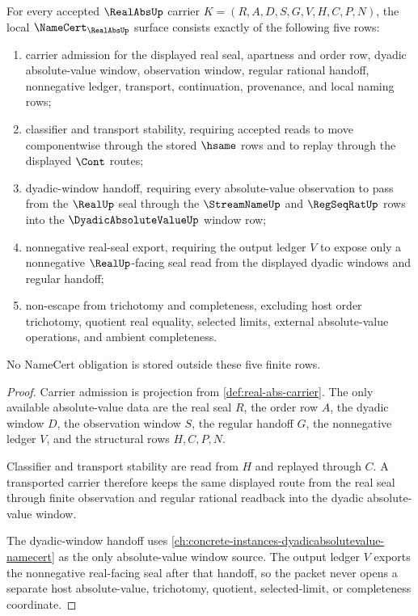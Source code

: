 \begin{theorem}
\label{thm:real-abs-namecert-obligations}
For every accepted $\RealAbsUp$ carrier $K=(R,A,D,S,G,V,H,C,P,N)$, the local $\NameCert_{\RealAbsUp}$ surface consists exactly of the following five rows:
\begin{enumerate}
\item carrier admission for the displayed real seal, apartness and order row, dyadic absolute-value window, observation window, regular rational handoff, nonnegative ledger, transport, continuation, provenance, and local naming rows;
\item classifier and transport stability, requiring accepted reads to move componentwise through the stored $\hsame$ rows and to replay through the displayed $\Cont$ routes;
\item dyadic-window handoff, requiring every absolute-value observation to pass from the $\RealUp$ seal through the $\StreamNameUp$ and $\RegSeqRatUp$ rows into the $\DyadicAbsoluteValueUp$ window row;
\item nonnegative real-seal export, requiring the output ledger $V$ to expose only a nonnegative $\RealUp$-facing seal read from the displayed dyadic windows and regular handoff;
\item non-escape from trichotomy and completeness, excluding host order trichotomy, quotient real equality, selected limits, external absolute-value operations, and ambient completeness.
\end{enumerate}
No NameCert obligation is stored outside these five finite rows.
\end{theorem}
\begin{proof}
Carrier admission is projection from \autoref{def:real-abs-carrier}. The only available absolute-value data are the real seal $R$, the order row $A$, the dyadic window $D$, the observation window $S$, the regular handoff $G$, the nonnegative ledger $V$, and the structural rows $H,C,P,N$.

Classifier and transport stability are read from $H$ and replayed through $C$. A transported carrier therefore keeps the same displayed route from the real seal through finite observation and regular rational readback into the dyadic absolute-value window.

The dyadic-window handoff uses \autoref{ch:concrete-instances-dyadicabsolutevalue-namecert} as the only absolute-value window source. The output ledger $V$ exports the nonnegative real-facing seal after that handoff, so the packet never opens a separate host absolute-value, trichotomy, quotient, selected-limit, or completeness coordinate.
\end{proof}

